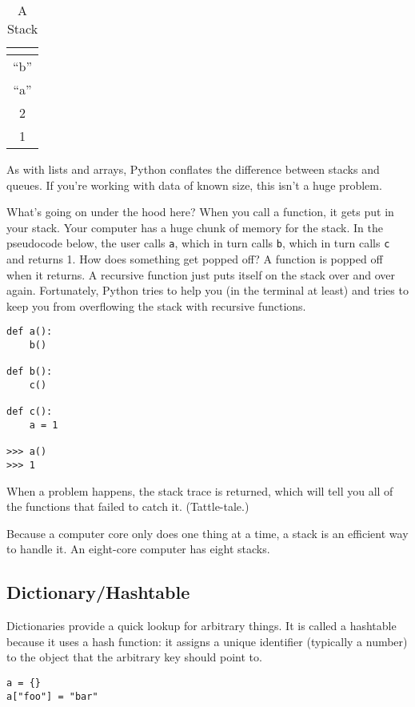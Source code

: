 \documentclass[12pt,letter]{article}
\begin{document}
\begin{table}
\begin{center}
\caption{A Stack}
\label{stackfig}
\begin{tabular}{|c|}
\multicolumn{1}{c}{} \\
\hline
``b'' \\
\hline
``a'' \\
\hline
2 \\
\hline
1 \\
\hline
\end{tabular}
\end{center}
\end{table}

As with lists and arrays, Python conflates the difference between
stacks and queues. If you're working with data of known size, this
isn't a huge problem. 

What's going on under the hood here? When you call a function, it gets
put in your stack. Your computer has a huge chunk of memory for the
stack. In the pseudocode below, the user calls \texttt{a}, which in
turn calls \texttt{b}, which in turn calls \texttt{c} and returns
1. How does something get popped off? A function is popped off when it
returns. A recursive function just puts itself on the stack over and
over again.\footnotemark {} Fortunately, Python tries to help you (in the terminal at
least) and tries to keep you from overflowing the stack with recursive
functions. 

\begin{verbatim}
def a():
    b()

def b():
    c()

def c():
    a = 1

>>> a()
>>> 1
\end{verbatim}

When a problem happens, the stack trace is returned, which will tell
you all of the functions that failed to catch it. (Tattle-tale.)

Because a computer core only does one thing at a time, a stack is an
efficient way to handle it. An eight-core computer has eight
stacks. 

\subsection{Dictionary/Hashtable}

Dictionaries provide a quick lookup for arbitrary things. It is called
a hashtable because it uses a hash function: it assigns a unique
identifier (typically a number) to the object that the arbitrary key
should point to. 
\begin{verbatim}
a = {}
a["foo"] = "bar"
\end{verbatim}
\end{document}
